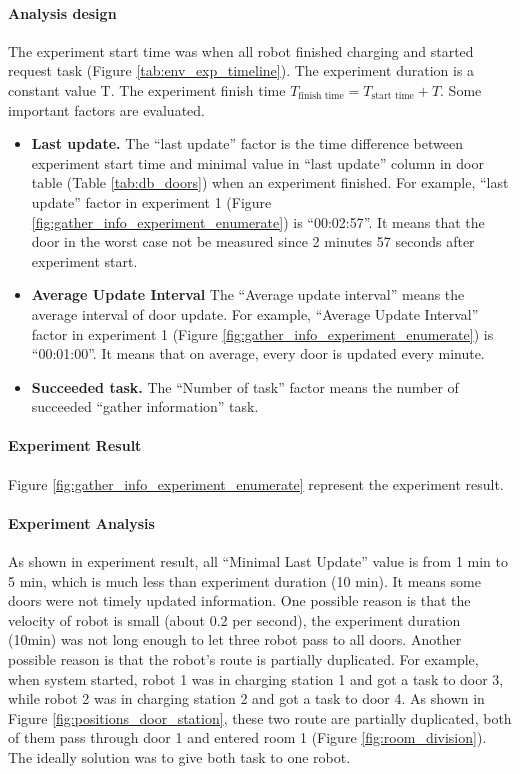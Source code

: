\paragraph{Analysis design} The experiment start time was when all robot finished charging and started request task (Figure \ref{tab:env_exp_timeline}). The experiment duration is a constant value T. The experiment finish time $T_{\mbox{finish time}} = T_{\mbox{start time}} + T $. Some important factors are evaluated. 

\begin{itemize}
    \item \textbf{Last update.} The ``last update'' factor is the time difference between experiment start time and minimal value in ``last update'' column in door table (Table \ref{tab:db_doors}) when an experiment finished. For example, ``last update'' factor in experiment 1 (Figure \ref{fig:gather_info_experiment_enumerate})  is ``00:02:57''. It means that the door in the worst case not be measured since 2 minutes 57 seconds after experiment start.
    \item \textbf{Average Update Interval} The ``Average update interval'' means the average interval of door update. For example, ``Average Update Interval'' factor in experiment 1 (Figure \ref{fig:gather_info_experiment_enumerate}) is ``00:01:00''. It means that on average, every door is updated every minute.
    \item \textbf{Succeeded task.} The ``Number of task'' factor  means the number of succeeded ``gather information'' task.
\end{itemize}

\paragraph{Experiment Result} 
Figure \ref{fig:gather_info_experiment_enumerate} represent the experiment result.

\paragraph{Experiment Analysis} 

As shown in experiment result, all ``Minimal Last Update'' value is from 1 min to 5 min, which is much less than experiment duration (10 min). It means some doors were not timely updated information. One possible reason is that the velocity of robot is small (about 0.2 per second), the experiment duration (10min) was not long enough to let three robot pass to all doors. Another possible reason is that the robot's route is partially duplicated. For example, when system started, robot 1 was in charging station 1 and got a task to door 3, while robot 2 was in charging station 2 and got a task to door 4. As shown in Figure \ref{fig:positions_door_station}, these two route are partially duplicated, both of them pass through door 1 and entered room 1 (Figure \ref{fig:room_division}). The ideally solution was to give both task to one robot. 

